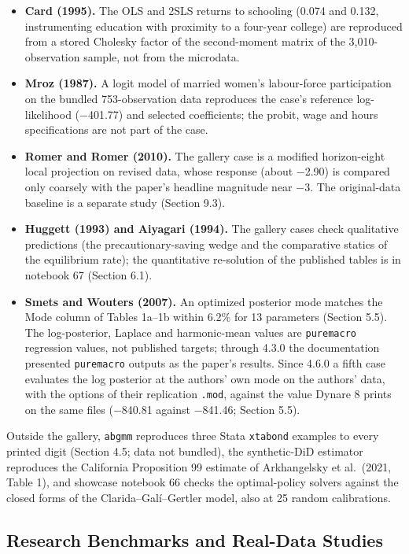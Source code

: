 \documentclass[11pt,letterpaper]{article}
\providecommand{\tightlist}{\setlength{\itemsep}{0pt}\setlength{\parskip}{0pt}}
\renewcommand{\_}{\pmunderscore\allowbreak}
\begin{document}
\begin{itemize}
\tightlist
\item
  \textbf{Card (1995).} The OLS and 2SLS returns to schooling (0.074 and 0.132, instrumenting education with proximity to a four-year college) are reproduced from a stored Cholesky factor of the second-moment matrix of the 3,010-observation sample, not from the microdata.
\item
  \textbf{Mroz (1987).} A logit model of married women's labour-force participation on the bundled 753-observation data reproduces the case's reference log-likelihood (−401.77) and selected coefficients; the probit, wage and hours specifications are not part of the case.
\item
  \textbf{Romer and Romer (2010).} The gallery case is a modified horizon-eight local projection on revised data, whose response (about −2.90) is compared only coarsely with the paper's headline magnitude near −3. The original-data baseline is a separate study (Section 9.3).
\item
  \textbf{Huggett (1993) and Aiyagari (1994).} The gallery cases check qualitative predictions (the precautionary-saving wedge and the comparative statics of the equilibrium rate); the quantitative re-solution of the published tables is in notebook 67 (Section 6.1).
\item
  \textbf{Smets and Wouters (2007).} An optimized posterior mode matches the Mode column of Tables 1a--1b within 6.2\% for 13 parameters (Section 5.5). The log-posterior, Laplace and harmonic-mean values are \texttt{puremacro} regression values, not published targets; through 4.3.0 the documentation presented \texttt{puremacro} outputs as the paper's results. Since 4.6.0 a fifth case evaluates the log posterior at the authors' own mode on the authors' data, with the options of their replication \texttt{.mod}, against the value Dynare 8 prints on the same files (−840.81 against −841.46; Section 5.5).
\end{itemize}

Outside the gallery, \texttt{ab\_gmm} reproduces three Stata \texttt{xtabond} examples to every printed digit (Section 4.5; data not bundled), the synthetic-DiD estimator reproduces the California Proposition 99 estimate of Arkhangelsky et al.~(2021, Table 1), and showcase notebook 66 checks the optimal-policy solvers against the closed forms of the Clarida--Galí--Gertler model, also at 25 random calibrations.

\subsection{Research Benchmarks and Real-Data Studies}\label{research-benchmarks-and-real-data-studies}
\end{document}
